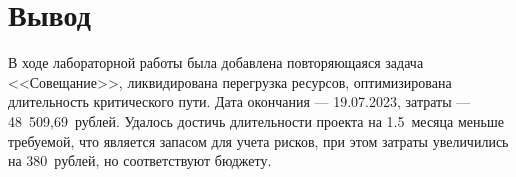 \section{Вывод}

В ходе лабораторной работы была добавлена повторяющаяся задача <<Совещание>>,
ликвидирована перегрузка ресурсов, оптимизирована длительность критического
пути. Дата окончания --- 19.07.2023, затраты --- 48~509,69~рублей. Удалось
достичь длительности проекта на 1.5~месяца меньше требуемой, что является
запасом для учета рисков, при этом затраты увеличились на 380~рублей, но
соответствуют бюджету.
